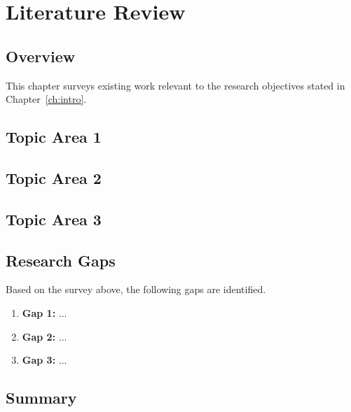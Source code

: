 
\chapter{Literature Review}
\label{ch:litreview}

\section{Overview}

This chapter surveys existing work relevant to the research objectives stated
in Chapter~\ref{ch:intro}.

\section{Topic Area 1}
\label{sec:lr1}


\section{Topic Area 2}
\label{sec:lr2}

\section{Topic Area 3}
\label{sec:lr3}

\section{Research Gaps}
\label{sec:gaps}

Based on the survey above, the following gaps are identified.

\begin{enumerate}
  \item \textbf{Gap 1:} ...
  \item \textbf{Gap 2:} ...
  \item \textbf{Gap 3:} ...
\end{enumerate}

\section{Summary}
\label{sec:lr-summary}
